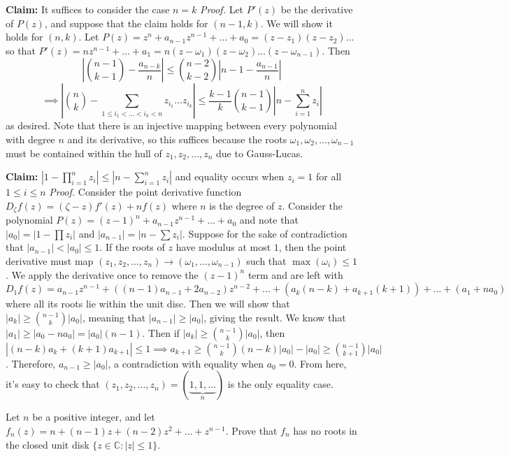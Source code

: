 \documentclass[11pt]{scrartcl}
\theoremstyle{plain} %
\theoremstyle{definition}
\theoremstyle{remark}
\theoremstyle{empty}
\theoremstyle{empty}
\theoremstyle{empty}
\theoremstyle{empty}
\theoremstyle{empty}
\theoremstyle{empty}
\theoremstyle{empty}
\begin{document}
\begin{solution}
\textbf{Claim: }It suffices to consider the case $n=k$
\textit{Proof. }Let $P'(z)$ be the derivative of $P(z)$, and suppose that the claim holds for $(n-1,k)$. We will show it holds for $(n,k)$. Let $P(z) = z^n + a_{n-1}z^{n-1} + \ldots + a_0 = (z-z_1)(z-z_2)\ldots$ so that $P'(z) = nz^{n-1} + \ldots + a_1 = n(z-\omega_1)(z-\omega_2)\ldots (z-\omega_{n-1})$. Then \[\left | {n-1 \choose k-1} - \frac{a_{n-k}}{n}\right | \le {n-2 \choose k-2} \left | n-1 - \frac{a_{n-1}}{n} \right |\] \[\implies \left | {n \choose k} - \sum_{1\le i_1 < \ldots < i_k < n} z_{i_1}\ldots z_{i_k} \right | \le \frac{k-1}{k} {n-1 \choose k-1} \left |n - \sum_{i=1}^n z_i\right |\] as desired. Note that there is an injective mapping between every polynomial with degree $n$ and its derivative, so this suffices because the roots $\omega_1, \omega_2, \ldots, \omega_{n-1}$ must be contained within the hull of $z_1, z_2, \ldots, z_n$ due to Gauss-Lucas.

\textbf{Claim: }$\left | 1 - \prod_{i=1}^n z_i \right | \le \left | n - \sum_{i=1}^n z_i \right |$ and equality occurs when $z_i = 1$ for all $1 \le i\le n$
\textit{Proof. }Consider the point derivative function $D_\zeta f(z) = (\zeta - z)f'(z) + nf(z)$ where $n$ is the degree of $z$. Consider the polynomial $P(z) = (z-1)^n + a_{n-1}z^{n-1} + \ldots + a_0$ and note that $|a_0| = |1 - \prod z_i|$ and $|a_{n-1}| = |n - \sum z_i|$. Suppose for the sake of contradiction that $|a_{n-1}| < |a_0| \le 1$. If the roots of $z$ have modulus at most $1$, then the point derivative must map $(z_1, z_2, \ldots, z_n) \to (\omega_1, \ldots, \omega_{n-1})$ such that $\max( \omega_i) \le 1$. We apply the derivative once to remove the $(z-1)^n$ term and are left with $D_{1} f(z) = a_{n-1}z^{n-1} + ((n-1)a_{n-1} + 2a_{n-2})z^{n-2} + \ldots + (a_{k} (n-k) + a_{k+1}(k+1)) + \ldots + (a_1 + n a_0)$ where all its roots lie within the unit disc. Then we will show that $|a_k| \ge {n-1 \choose k} |a_0|$, meaning that $|a_{n-1}| \ge |a_0|$, giving the result. We know that $|a_1| \ge |a_0 - na_0| = |a_0|(n-1)$. Then if $|a_k| \ge {n-1 \choose k}|a_0|$, then $|(n-k)a_k + (k+1)a_{k+1}| \le 1 \implies a_{k+1} \ge {n-1 \choose k}(n-k)|a_0| - |a_0| \ge {n-1 \choose k+1}|a_0|$. Therefore, $a_{n-1} \ge |a_0|$, a contradiction with equality when $a_0 = 0$. From here, it's easy to check that $(z_1, z_2, \ldots, z_n) = (\underbrace{1,1,\ldots}_{n})$ is the only equality case. 
\end{solution}

\begin{problem}[2018 Putnam B2]
    Let $n$ be a positive integer, and let $f_n(z) = n + (n-1)z + (n-2)z^2 + \dots + z^{n-1}$. Prove that $f_n$ has no roots in the closed unit disk $\{z \in \mathbb{C}: |z| \le 1\}$.
\end{problem}
\end{document}
